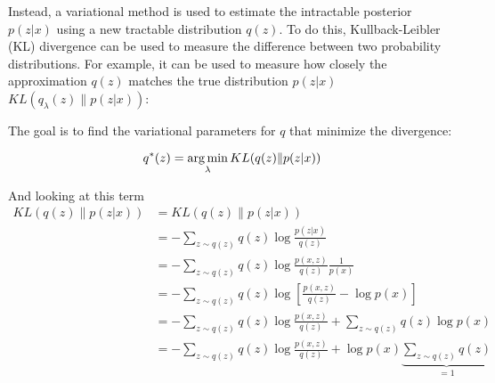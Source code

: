 






Instead, a variational method is used to estimate the intractable posterior $p(z|x)$ using a new tractable distribution $q(z)$. To do this, Kullback-Leibler (KL) divergence can be used to measure the difference between two probability distributions. For example, it can be used to measure how closely the approximation $q(z)$ matches the true distribution $p(z|x)$ 
$KL(q_{\lambda}(z) \| p(z|x))$:

The goal is to find the variational parameters for $q$ that minimize the divergence:

\begin{equation}
  q^{*}(z) = \operatorname*{arg\,min}_{\lambda} KL(q(z) \| p(z|x))
\end{equation}

And looking at this term
$$
\begin{aligned}
KL(q(z) \| p(z|x))
  &= KL(q(z) \| p(z|x)) \\
  &= -\sum_{z \sim q(z)} q(z) \log \frac{p(z|x)}{q(z)} \\
  &= -\sum_{z \sim q(z)} q(z) \log \frac{p(x,z)}{q(z)} \frac{1}{p(x)} \\
  &= -\sum_{z \sim q(z)} q(z) \log \left[ \frac{p(x,z)}{q(z)} - \log p(x) \right] \\
  &= -\sum_{z \sim q(z)} q(z) \log \frac{p(x,z)}{q(z)} 
  + \sum_{z \sim q(z)} q(z) \log p(x) \\
  &= -\sum_{z \sim q(z)} q(z) \log \frac{p(x,z)}{q(z)} 
  + \log p(x) \underbrace{\sum_{z \sim q(z)} q(z)}_{=1} \\
\end{aligned}
$$

